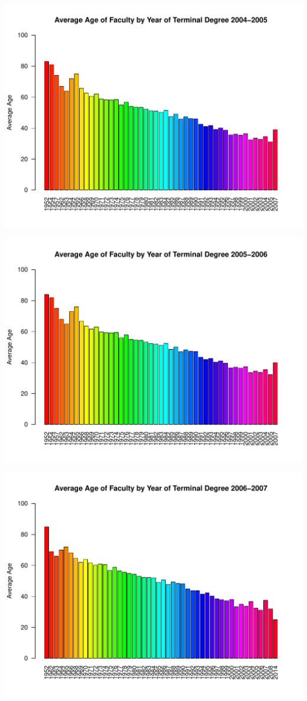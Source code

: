 \documentclass[12pt,a4paper]{article}\usepackage[]{graphicx}\usepackage[]{color}
\makeatletter
\def\maxwidth{ %
  \ifdim\Gin@nat@width>\linewidth
    \linewidth
  \else
    \Gin@nat@width
  \fi
}
\newenvironment{knitrout}{}{} %
\theoremstyle{definition}
\makeatother
\begin{document}
\begin{knitrout}
\color{fgcolor}
\includegraphics[width=\maxwidth]{figure/unnamed-chunk-12-1} 

\includegraphics[width=\maxwidth]{figure/unnamed-chunk-12-2} 

\includegraphics[width=\maxwidth]{figure/unnamed-chunk-12-3} 


\end{knitrout}
\end{document}
